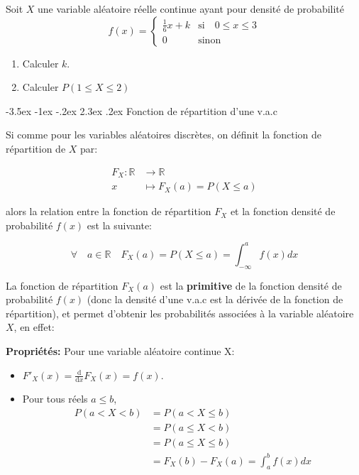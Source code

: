 \documentclass[]{book}
\makeatletter
\providecommand{\tightlist}{%
  \setlength{\itemsep}{0pt}\setlength{\parskip}{0pt}}
\renewcommand\section{\@startsection {section}{1}{\z@}%
                                   {-3.5ex \@plus -1ex \@minus -.2ex}%
                                   {2.3ex \@plus.2ex}%
                                   {\normalfont\Large\bfseries\color{ForestGreen}}}
\theoremstyle{magentacolor}
\theoremstyle{proprie}
\theoremstyle{exstyle}
\theoremstyle{exostyle}
\theoremstyle{definition}
\theoremstyle{definition}
\theoremstyle{definition}
\theoremstyle{remark}
\let\BeginKnitrBlock\begin \let\EndKnitrBlock\end
\makeatother
\begin{document}
\BeginKnitrBlock{rmdexercise}
Soit \(X\) une variable aléatoire réelle continue ayant pour densité de
probabilité \[f(x)= \left\lbrace
      \begin{array}{ll}
      \frac{1}{6} x + k  & \mbox{si} \quad 0\le x \le 3\\
      0 & \mbox{sinon}
      \end{array}
  \right.\]

\begin{enumerate}
\def\labelenumi{\arabic{enumi}.}
\tightlist
\item
  Calculer \(k\).
\item
  Calculer \(P(1 \le X \le 2)\)
\end{enumerate}
\EndKnitrBlock{rmdexercise}

\hypertarget{fonction-de-repartition-dune-v.a.c}{%
\section{Fonction de répartition d'une v.a.c}\label{fonction-de-repartition-dune-v.a.c}}

\BeginKnitrBlock{definition}
\protect\hypertarget{def:unnamed-chunk-36}{}{\label{def:unnamed-chunk-36} }Si comme pour les variables aléatoires discrètes, on définit la fonction
de répartition de \(X\) par:

\[\begin{aligned}
    F_X \colon  \mathbb{R} &\longrightarrow \mathbb{R} \\
                x &\longmapsto F_X(a) = P(X \le a)\end{aligned}\]

alors la relation entre la fonction de répartition \(F_X\) et la fonction
densité de probabilité \(f(x)\) est la suivante:

\[\forall \quad a \in \mathbb{R} \quad F_X(a)= P(X \le a) = \int_{-\infty}^a f(x)dx\]
\EndKnitrBlock{definition}

La fonction de répartition \(F_X(a)\) est la \textbf{primitive} de la fonction
densité de probabilité \(f(x)\) (donc la densité d'une v.a.c est la
dérivée de la fonction de répartition), et permet d'obtenir les
probabilités associées à la variable aléatoire \(X\), en effet:

\textbf{Propriétés:} Pour une variable aléatoire continue X:

\begin{itemize}
\item
  \(F'_X(x) = \frac{\text{d}}{\text{d} x} F_X(x) = f(x)\).
\item
  Pour tous réels \(a \le b\), \[\begin{aligned}
        P(a < X < b)      & = P(a < X \le b) \\
                          & = P(a \le X < b) \\
                          & = P( a \le X \le b) \\
                          & = F_X(b) - F_X(a) = \int_a^bf(x)dx
      \end{aligned}\]
\end{itemize}
\end{document}

